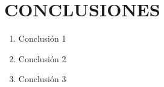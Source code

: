 \cleardoublepage{}
\chapter*{CONCLUSIONES}
\begin{enumerate}

    \item Conclusión 1

    \item Conclusión 2

    \item Conclusión 3

\end{enumerate}

